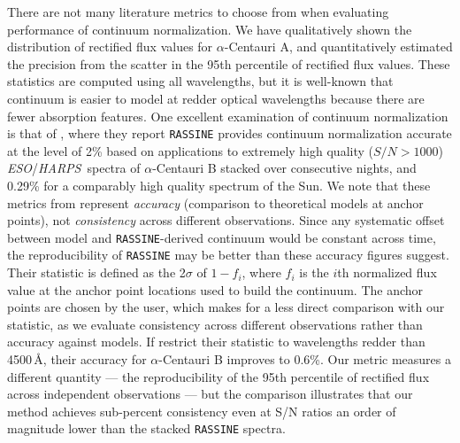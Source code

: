 \documentclass[modern,linenumbers]{aastex631}
\newcommand{\project}[1]{\textit{#1}}
\newcommand{\eso}{\project{ESO}}
\newcommand{\harps}{\project{HARPS}}
\renewcommand{\added}[1]{#1}
\newcommand{\removed}[1]{}
\begin{document}
There are not many literature metrics to choose from when evaluating performance of continuum normalization. We have qualitatively shown the distribution of rectified flux values for $\alpha$-Centauri A, and quantitatively estimated the precision from the scatter in the 95th percentile of rectified flux values. These statistics are computed using all wavelengths, but it is well-known that continuum is easier to model at redder optical wavelengths because there are fewer absorption features. One excellent examination of continuum normalization \removed{consistency} is that of \citet{Cretignier:2020}, where they report \removed{consistent} \added{\texttt{RASSINE} provides} continuum normalization \removed{with \texttt{RASSINE}} \added{accurate} at the level of 2\% based on applications to extremely high quality ($S/N > 1000$) \eso/\harps\ spectra of $\alpha$-Centauri B stacked over consecutive nights, and 0.29\% for a comparably high quality spectrum of the Sun. \added{We note that these metrics from \citet{Cretignier:2020} represent \emph{accuracy} (comparison to theoretical models at anchor points), not \emph{consistency} across different observations. Since any systematic offset between model and \texttt{RASSINE}-derived continuum would be constant across time, the reproducibility of \texttt{RASSINE} may be better than these accuracy figures suggest.} Their statistic is defined as the 2$\sigma$ of $1-f_i$, where $f_i$ is the $i$th normalized flux value at the anchor point locations used to build the continuum. The anchor points are chosen by the user, which makes for a less direct comparison with our statistic\added{, as we evaluate consistency across different observations rather than accuracy against models}. \removed{but for these purposes we will assume that the continuum anchor points are perfectly chosen and truely represent the continuum in the star. Given these assumptions, for comparison purposes we take that an expert user of \texttt{RASSINE} \citep{Cretignier:2020} can achieve 1\% consistency in continuum estimates for S/N $> 1000$ spectra of $\alpha$-Centauri B, and 0.15\% consitency for comparable Solar spectra.} If \citet{Cretignier:2020} restrict their statistic to wavelengths redder than 4500\,\AA, their \added{accuracy} \removed{precision} for $\alpha$-Centauri B improves to 0.6\%. \added{Our metric measures a different quantity --- the reproducibility of the 95th percentile of rectified flux across independent observations --- but the comparison illustrates that our method achieves sub-percent consistency even at S/N ratios an order of magnitude lower than the stacked \texttt{RASSINE} spectra.}\\
\end{document}
